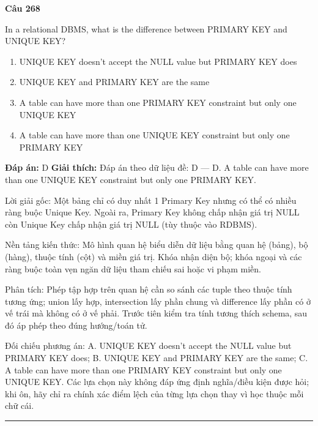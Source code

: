 \documentclass[11pt,a4paper]{article}
\newenvironment{question}[1]{%
  \par\vspace{1em}\noindent\textbf{\large Câu #1}\par\vspace{0.4em}
}{%
  \par\vspace{1em}\hrule\vspace{0.6em}
}
\newenvironment{choices}{%
  \begin{enumerate}[label=\textbf{\Alph*.},leftmargin=2.2em,itemsep=2pt,topsep=3pt]
}{%
  \end{enumerate}
}
\newcommand{\choice}{\item}
\begin{document}
\begin{question}{268}
In a relational DBMS, what is the difference between PRIMARY KEY and UNIQUE KEY?
\begin{choices}
\choice UNIQUE KEY doesn't accept the NULL value but PRIMARY KEY does
\choice UNIQUE KEY and PRIMARY KEY are the same
\choice A table can have more than one PRIMARY KEY constraint but only one UNIQUE KEY
\choice A table can have more than one UNIQUE KEY constraint but only one PRIMARY KEY
\end{choices}
\textbf{Đáp án:} D
\textbf{Giải thích:} Đáp án theo dữ liệu đề: D — D. A table can have more than one UNIQUE KEY constraint but only one PRIMARY KEY.

Lời giải gốc: Một bảng chỉ có duy nhất 1 Primary Key nhưng có thể có nhiều ràng buộc Unique Key. Ngoài ra, Primary Key không chấp nhận giá trị NULL còn Unique Key chấp nhận giá trị NULL (tùy thuộc vào RDBMS).

Nền tảng kiến thức: Mô hình quan hệ biểu diễn dữ liệu bằng quan hệ (bảng), bộ (hàng), thuộc tính (cột) và miền giá trị. Khóa nhận diện bộ; khóa ngoại và các ràng buộc toàn vẹn ngăn dữ liệu tham chiếu sai hoặc vi phạm miền.

Phân tích: Phép tập hợp trên quan hệ cần so sánh các tuple theo thuộc tính tương ứng; union lấy hợp, intersection lấy phần chung và difference lấy phần có ở vế trái mà không có ở vế phải. Trước tiên kiểm tra tính tương thích schema, sau đó áp phép theo đúng hướng/toán tử.

Đối chiếu phương án: A. UNIQUE KEY doesn't accept the NULL value but PRIMARY KEY does; B. UNIQUE KEY and PRIMARY KEY are the same; C. A table can have more than one PRIMARY KEY constraint but only one UNIQUE KEY. Các lựa chọn này không đáp ứng định nghĩa/điều kiện được hỏi; khi ôn, hãy chỉ ra chính xác điểm lệch của từng lựa chọn thay vì học thuộc mỗi chữ cái.
\end{question}
\end{document}
